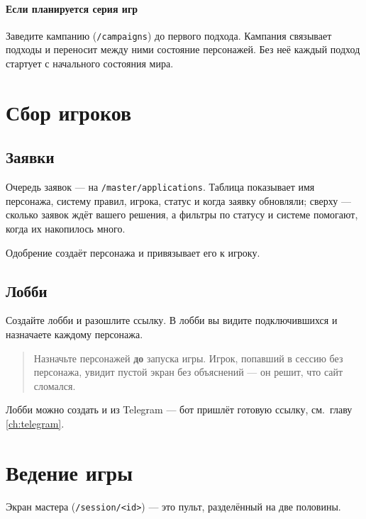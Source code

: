 \paragraph{Если планируется серия игр}
Заведите кампанию (\texttt{/campaigns}) до первого подхода. Кампания связывает подходы и переносит между ними состояние персонажей. Без неё каждый подход стартует с начального состояния мира.

\section{Сбор игроков}
\label{sec:master:lobby}

\subsection{Заявки}
Очередь заявок --- на \texttt{/master/applications}. Таблица показывает имя персонажа, систему правил, игрока, статус и когда заявку обновляли; сверху --- сколько заявок ждёт вашего решения, а фильтры по статусу и системе помогают, когда их накопилось много.


Одобрение создаёт персонажа и привязывает его к игроку.

\subsection{Лобби}
Создайте лобби и разошлите ссылку. В лобби вы видите подключившихся и назначаете каждому персонажа.

\begin{quote}
\small
Назначьте персонажей \textbf{до} запуска игры. Игрок, попавший в сессию без персонажа, увидит пустой экран без объяснений --- он решит, что сайт сломался.
\end{quote}

Лобби можно создать и из Telegram --- бот пришлёт готовую ссылку, см.\ главу \ref{ch:telegram}.

\section{Ведение игры}
\label{sec:master:run}

Экран мастера (\texttt{/session/<id>}) --- это пульт, разделённый на две половины.


